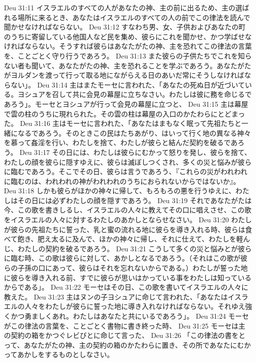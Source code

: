 Deu 31:11  イスラエルのすべての人があなたの神、主の前に出るため、主の選ばれる場所に来るとき、あなたはイスラエルのすべての人の前でこの律法を読んで聞かせなければならない。
Deu 31:12  すなわち男、女、子供およびあなたの町のうちに寄留している他国人など民を集め、彼らにこれを聞かせ、かつ学ばせなければならない。そうすれば彼らはあなたがたの神、主を恐れてこの律法の言葉を、ことごとく守り行うであろう。
Deu 31:13  また彼らの子供たちでこれを知らない者も聞いて、あなたがたの神、主を恐れることを学ぶであろう。あなたがたがヨルダンを渡って行って取る地にながらえる日のあいだ常にそうしなければならない」。
Deu 31:14  主はまたモーセに言われた、「あなたの死ぬ日が近づいている。ヨシュアを召して共に会見の幕屋に立ちなさい。わたしは彼に務を命じるであろう」。モーセとヨシュアが行って会見の幕屋に立つと、
Deu 31:15  主は幕屋で雲の柱のうちに現れられた。その雲の柱は幕屋の入口のかたわらにとどまった。
Deu 31:16  主はモーセに言われた、「あなたはまもなく眠って先祖たちと一緒になるであろう。そのときこの民はたちあがり、はいって行く地の異なる神々を慕って姦淫を行い、わたしを捨て、わたしが彼らと結んだ契約を破るであろう。
Deu 31:17  その日には、わたしは彼らにむかって怒りを発し、彼らを捨て、わたしの顔を彼らに隠すゆえに、彼らは滅ぼしつくされ、多くの災と悩みが彼らに臨むであろう。そこでその日、彼らは言うであろう、『これらの災がわれわれに臨むのは、われわれの神がわれわれのうちにおられないからではないか』。
Deu 31:18  しかも彼らがほかの神々に帰して、もろもろの悪を行うゆえに、わたしはその日には必ずわたしの顔を隠すであろう。
Deu 31:19  それであなたがたは今、この歌を書きしるし、イスラエルの人々に教えてその口に唱えさせ、この歌をイスラエルの人々に対するわたしのあかしとならせなさい。
Deu 31:20  わたしが彼らの先祖たちに誓った、乳と蜜の流れる地に彼らを導き入れる時、彼らは食べて飽き、肥え太るに及んで、ほかの神々に帰し、それに仕えて、わたしを軽んじ、わたしの契約を破るであろう。
Deu 31:21  こうして多くの災と悩みとが彼らに臨む時、この歌は彼らに対して、あかしとなるであろう。（それはこの歌が彼らの子孫の口にあって、彼らはそれを忘れないからである。）わたしが誓った地に彼らを導き入れる前、すでに彼らが思いはかっている事をわたしは知っているからである」。
Deu 31:22  モーセはその日、この歌を書いてイスラエルの人々に教えた。
Deu 31:23  主はヌンの子ヨシュアに命じて言われた、「あなたはイスラエルの人々をわたしが彼らに誓った地に導き入れなければならない。それゆえ強くかつ勇ましくあれ。わたしはあなたと共にいるであろう」。
Deu 31:24  モーセがこの律法の言葉を、ことごとく書物に書き終った時、
Deu 31:25  モーセは主の契約の箱をかつぐレビびとに命じて言った、
Deu 31:26  「この律法の書をとって、あなたがたの神、主の契約の箱のかたわらに置き、その所であなたにむかってあかしをするものとしなさい。
